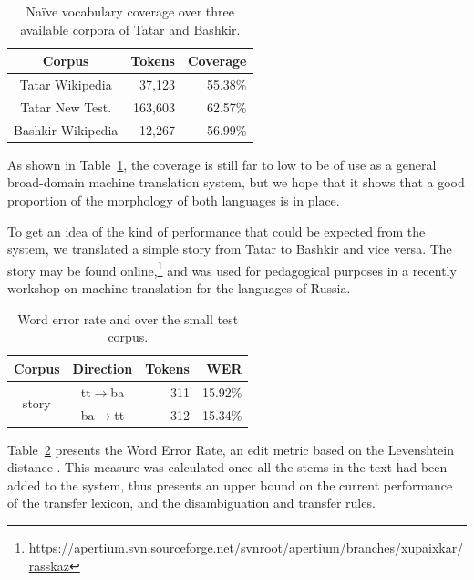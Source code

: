 \documentclass[11pt,a4paper]{article}
\begin{document}
\begin{table}
  \begin{center}
  \begin{tabular}{c|r|r}
   Corpus                  & Tokens    & Coverage\\
   \hline
   Tatar Wikipedia         & 37,123    & 55.38\% \\
   Tatar New Test.         & 163,603   & 62.57\% \\
   \hline
   Bashkir Wikipedia       & 12,267    & 56.99\% \\
   \hline
  \end{tabular}
    \caption{Na\"ive vocabulary coverage over three available corpora of Tatar and Bashkir.}
    \label{table:coverage}
  \end{center}
\end{table}

As shown in Table~\ref{table:coverage}, the coverage is still far to low to be of use as a 
general broad-domain machine translation
system, but we hope that it shows that a good proportion of the morphology of both languages
is in place.

To get an idea of the kind of performance that could be expected from the system, we 
translated a simple story from Tatar to Bashkir and vice versa. The story may be found 
online,\footnote{\url{https://apertium.svn.sourceforge.net/svnroot/apertium/branches/xupaixkar/rasskaz}}
and was used for pedagogical purposes in a recently workshop on machine translation
for the languages of Russia.

\begin{table}
  \begin{center}
  \begin{tabular}{c|c|r|r}
   Corpus                 & Direction         & Tokens  & WER  \\
  \hline
   \multirow{2}{*}{story} & tt$\rightarrow$ba & 311     & 15.92\% \\
                          & ba$\rightarrow$tt & 312     & 15.34\%  \\
  \hline
  \end{tabular}
    \caption{Word error rate and over the small test corpus.}
    \label{table:wer}
  \end{center}
\end{table}


Table~\ref{table:wer} presents the Word Error Rate, an edit metric based on the Levenshtein 
distance \cite{levenshtein/1966}. This measure was calculated once all the stems in the 
text had been added to the system, thus presents an upper bound on the current performance
of the transfer lexicon, and the disambiguation and transfer rules.
\end{document}
